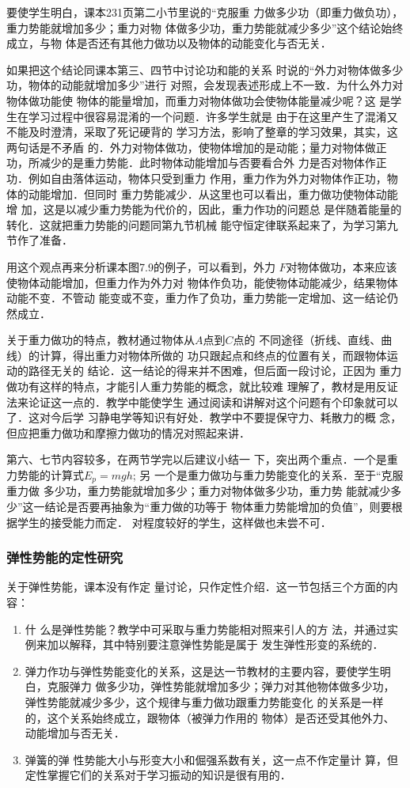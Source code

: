 要使学生明白，课本231页第二小节里说的“克服重
力做多少功（即重力做负功），重力势能就增加多少；重力对物
体做多少功，重力势能就减少多少”这个结论始终成立，与物
体是否还有其他力做功以及物体的动能变化与否无关．

如果把这个结论同课本第三、四节中讨论功和能的关系
时说的“外力对物体做多少功，物体的动能就增加多少”进行
对照，会发现表述形成上不一致．为什么外力对物体做功能使
物体的能量增加，而重力对物体做功会使物体能量减少呢？这
是学生在学习过程中很容易混淆的一个问题．许多学生就是
由于在这里产生了混淆又不能及时澄清，采取了死记硬背的
学习方法，影响了整章的学习效果，其实，这两句话是不矛盾
的．外力对物体做功，使物体增加的是动能；量力对物体做正
功，所减少的是重力势能．此时物体动能增加与否要看合外
力是否对物体作正功．例如自由落体运动，物体只受到重力
作用，重力作为外力对物体作正功，物体的动能增加．但同时
重力势能减少．从这里也可以看出，重力做功使物体动能增
加，这是以减少重力势能为代价的，因此，重力作功的问题总
是伴随着能量的转化．这就把重力势能的问题同第九节机械
能守恒定律联系起来了，为学习第九节作了准备．

用这个观点再来分析课本图7.9的例子，可以看到，外力
$F$对物体做功，本来应该使物体动能增加，但重力作为外力对
物体作负功，能使物体动能减少，结果物体动能不变．不管动
能变或不变，重力作了负功，重力势能一定增加、这一结论仍
然成立．

关于重力做功的特点，教材通过物体从$A$点到$C$点的
不同途径（折线、直线、曲线）的计算，得出重力对物体所做的
功只跟起点和终点的位置有关，而跟物体运动的路径无关的
结论．这一结论的得来并不困难，但后面一段讨论，正因为
重力做功有这样的特点，才能引人重力势能的概念，就比较难
理解了，教材是用反证法来论证这一点的．教学中能使学生
通过阅读和讲解对这个问题有个印象就可以了．这对今后学
习静电学等知识有好处．教学中不要提保守力、耗散力的概
念，但应把重力做功和摩擦力做功的情况对照起来讲．

第六、七节内容较多，在两节学完以后建议小结一
下，突出两个重点．一个是重力势能的计算式$E_p=mgh$; 另
一个是重力做功与重力势能变化的关系．至于“克服重力做
多少功，重力势能就增加多少；重力对物体做多少功，重力势
能就减少多少”这一结论是否要再抽象为“重力做的功等于
物体重力势能增加的负值”，则要根据学生的接受能力而定．
对程度较好的学生，这样做也未尝不可．


\subsubsection{弹性势能的定性研究}

关于弹性势能，课本没有作定
量讨论，只作定性介绍．这一节包括三个方面的内容：
\begin{enumerate}
\item 什
么是弹性势能？教学中可采取与重力势能相对照来引人的方
法，并通过实例来加以解释，其中特别要注意弹性势能是属于
发生弹性形变的系统的．
\item 弹力作功与弹性势能变化的关系，这是达一节教材的主要内容，要使学生明白，克服弹力
做多少功，弹性势能就增加多少；弹力对其他物体做多少功，
弹性势能就减少多少，这个规律与重力做功跟重力势能变化
的关系是一样的，这个关系始终成立，跟物体（被弹力作用的
物体）是否还受其他外力、动能增加与否无关．
\item 弹簧的弹
性势能大小与形变大小和倔强系数有关，这一点不作定量计
算，但定性掌握它们的关系对于学习振动的知识是很有用的．
\end{enumerate}

